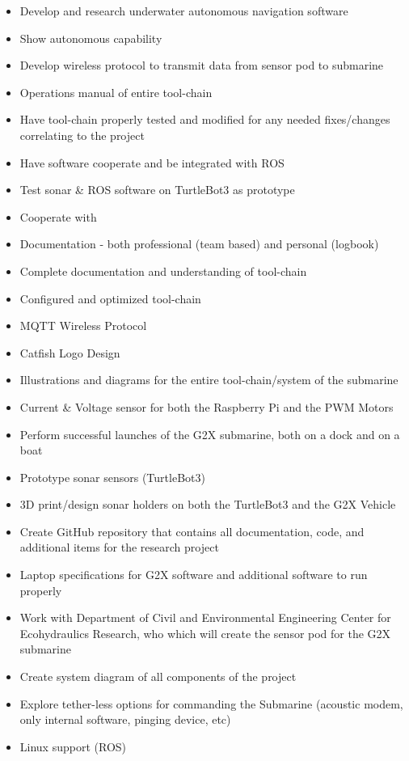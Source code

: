 \documentclass[12pt]{article}
\begin{document}
		\begin{itemize}
			\item Develop and research underwater autonomous navigation software
			\item Show autonomous capability
			\item Develop wireless protocol to transmit data from sensor pod to submarine
			\item Operations manual of entire tool-chain
			\item Have tool-chain properly tested and modified for any needed fixes/changes correlating to the project
			\item Have software cooperate and be integrated with ROS
			\item Test sonar \& ROS software on TurtleBot3 as prototype
			\item Cooperate with 
			\item Documentation - both professional (team based) and personal (logbook)
			\item Complete documentation and understanding of tool-chain
			\item Configured and optimized tool-chain
			\item MQTT Wireless Protocol
			\item Catfish Logo Design
			\item Illustrations and diagrams for the entire tool-chain/system of the submarine
			\item Current \& Voltage sensor for both the Raspberry Pi and the PWM Motors
			\item Perform successful launches of the G2X submarine, both on a dock and on a boat
			\item Prototype sonar sensors (TurtleBot3)
			\item 3D print/design sonar holders on both the TurtleBot3 and the G2X Vehicle
			\item Create GitHub repository that contains all documentation, code, and additional items for the research project
			\item Laptop specifications for G2X software and additional software to run properly
			\item Work with Department of Civil and Environmental Engineering Center for Ecohydraulics Research, who which will create the sensor pod for the G2X submarine
			\item Create system diagram of all components of the project
			\item Explore tether-less options for commanding the Submarine (acoustic modem, only internal software, pinging device, etc)
			\item Linux support (ROS)
		\end{itemize}
	
\end{document}
